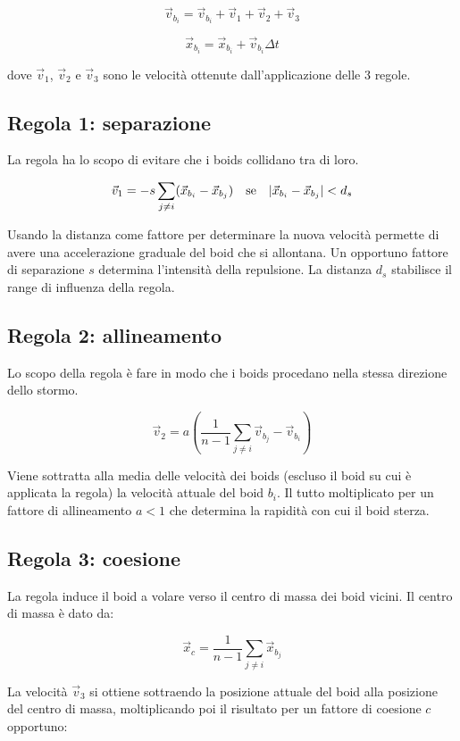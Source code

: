 \documentclass[]{article}
\begin{document}
$$\vec{v}_{b_i}=\vec{v}_{b_i}+\vec{v}_1+\vec{v}_2+\vec{v}_3$$

$$\vec{x}_{b_i}=\vec{x}_{b_i}+\vec{v}_{b_i} \Delta t$$

dove $\vec{v}_1$, $\vec{v}_2$ e $\vec{v}_3$ sono le velocità ottenute dall'applicazione delle 3 regole.

\subsection{Regola 1: separazione}

La regola ha lo scopo di evitare che i boids collidano tra di loro.

$$\vec{v}_1 = -s \sum_{j\ne i}(\vec{x}_{b_i}-\vec{x}_{b_j}) \text{\quad se\quad } |\vec{x}_{b_i}-\vec{x}_{b_j}|<d_s$$

Usando la distanza come fattore per determinare la nuova velocità permette di avere una accelerazione graduale del boid che si allontana. Un opportuno fattore di separazione $s$ determina l'intensità della repulsione. La distanza $d_s$ stabilisce il range di influenza della regola.

\subsection{Regola 2: allineamento}

Lo scopo della regola è fare in modo che i boids procedano nella stessa direzione dello stormo.

$$\vec{v}_2 = a(\frac{1}{n-1}\sum_{j\ne i}\vec{v}_{b_j} - \vec{v}_{b_i})$$

Viene sottratta alla media delle velocità dei boids (escluso il boid su cui è applicata la regola) la velocità attuale del boid $b_i$. Il tutto moltiplicato per un fattore di allineamento $a<1$ che determina la rapidità con cui il boid sterza.

\subsection{Regola 3: coesione}

La regola induce il boid a volare verso il centro di massa dei boid vicini. Il centro di massa è dato da:

$$\vec{x}_{c} = \frac{1}{n-1}\sum_{j\ne i}\vec{x}_{b_j}$$

La velocità $\vec{v}_3$ si ottiene sottraendo la posizione attuale del boid alla posizione del centro di massa, moltiplicando poi il risultato per un fattore di coesione $c$ opportuno:
\end{document}
